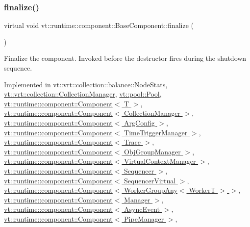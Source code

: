 \subsubsection{\texorpdfstring{finalize()}{finalize()}}
{\footnotesize\ttfamily virtual void vt\+::runtime\+::component\+::\+Base\+Component\+::finalize (\begin{DoxyParamCaption}{ }\end{DoxyParamCaption})\hspace{0.3cm}{\ttfamily [pure virtual]}}



Finalize the component. Invoked before the destructor fires during the shutdown sequence. 



Implemented in \hyperlink{structvt_1_1vrt_1_1collection_1_1balance_1_1_node_stats_a267ac0f73734b89797be774b0bd6e7d1}{vt\+::vrt\+::collection\+::balance\+::\+Node\+Stats}, \hyperlink{structvt_1_1vrt_1_1collection_1_1_collection_manager_afafcdbf36f42835471218b654252031c}{vt\+::vrt\+::collection\+::\+Collection\+Manager}, \hyperlink{structvt_1_1pool_1_1_pool_a45a2880809625a77bb93c3dfcd9c7603}{vt\+::pool\+::\+Pool}, \hyperlink{structvt_1_1runtime_1_1component_1_1_component_a098e362de01af6054e5491fba671a959}{vt\+::runtime\+::component\+::\+Component$<$ T $>$}, \hyperlink{structvt_1_1runtime_1_1component_1_1_component_a098e362de01af6054e5491fba671a959}{vt\+::runtime\+::component\+::\+Component$<$ Collection\+Manager $>$}, \hyperlink{structvt_1_1runtime_1_1component_1_1_component_a098e362de01af6054e5491fba671a959}{vt\+::runtime\+::component\+::\+Component$<$ Arg\+Config $>$}, \hyperlink{structvt_1_1runtime_1_1component_1_1_component_a098e362de01af6054e5491fba671a959}{vt\+::runtime\+::component\+::\+Component$<$ Time\+Trigger\+Manager $>$}, \hyperlink{structvt_1_1runtime_1_1component_1_1_component_a098e362de01af6054e5491fba671a959}{vt\+::runtime\+::component\+::\+Component$<$ Trace $>$}, \hyperlink{structvt_1_1runtime_1_1component_1_1_component_a098e362de01af6054e5491fba671a959}{vt\+::runtime\+::component\+::\+Component$<$ Obj\+Group\+Manager $>$}, \hyperlink{structvt_1_1runtime_1_1component_1_1_component_a098e362de01af6054e5491fba671a959}{vt\+::runtime\+::component\+::\+Component$<$ Virtual\+Context\+Manager $>$}, \hyperlink{structvt_1_1runtime_1_1component_1_1_component_a098e362de01af6054e5491fba671a959}{vt\+::runtime\+::component\+::\+Component$<$ Sequencer $>$}, \hyperlink{structvt_1_1runtime_1_1component_1_1_component_a098e362de01af6054e5491fba671a959}{vt\+::runtime\+::component\+::\+Component$<$ Sequencer\+Virtual $>$}, \hyperlink{structvt_1_1runtime_1_1component_1_1_component_a098e362de01af6054e5491fba671a959}{vt\+::runtime\+::component\+::\+Component$<$ Worker\+Group\+Any$<$ Worker\+T $>$ $>$}, \hyperlink{structvt_1_1runtime_1_1component_1_1_component_a098e362de01af6054e5491fba671a959}{vt\+::runtime\+::component\+::\+Component$<$ Manager $>$}, \hyperlink{structvt_1_1runtime_1_1component_1_1_component_a098e362de01af6054e5491fba671a959}{vt\+::runtime\+::component\+::\+Component$<$ Async\+Event $>$}, \hyperlink{structvt_1_1runtime_1_1component_1_1_component_a098e362de01af6054e5491fba671a959}{vt\+::runtime\+::component\+::\+Component$<$ Pipe\+Manager $>$}, 